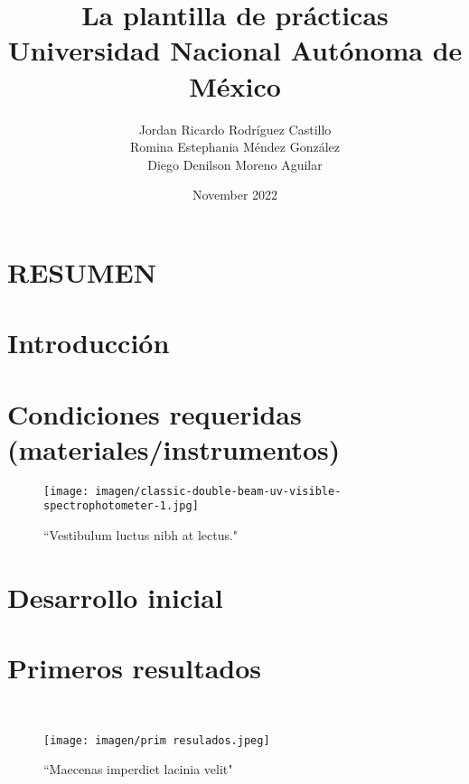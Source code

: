 \documentclass[letterpaper, 12px]{article}
\title{La plantilla de prácticas\\ Universidad Nacional Autónoma de México }
\author{Jordan Ricardo Rodríguez Castillo\\ Romina Estephania Méndez González\\ Diego Denilson Moreno Aguilar}
\date{November 2022}
\begin{document}
\maketitle
\section{RESUMEN}
\begin{abstract}
    \lipsum[1-2]
\end{abstract}


\section*{Introducción}
 \lipsum[1]

\section*{Condiciones requeridas (materiales/instrumentos)}
 \lipsum[2-3]

 \begin{figure}[h]
    \centering
    \texttt{[image: imagen/classic-double-beam-uv-visible-spectrophotometer-1.jpg]}
    \caption{``Vestibulum luctus nibh at lectus."}
    \label{fig:nstrumento de medición }
\end{figure}

\section*{Desarrollo inicial}
 \lipsum[4-9]

\section*{Primeros resultados}
 \lipsum[10]\\

\begin{figure}[h!]
    \centering
    \texttt{[image: imagen/prim resulados.jpeg]}
    \caption*{``Maecenas imperdiet lacinia velit"}
    \label{fig:primeros resultados}
\end{figure}


 \lipsum[11-12]
\end{document}
